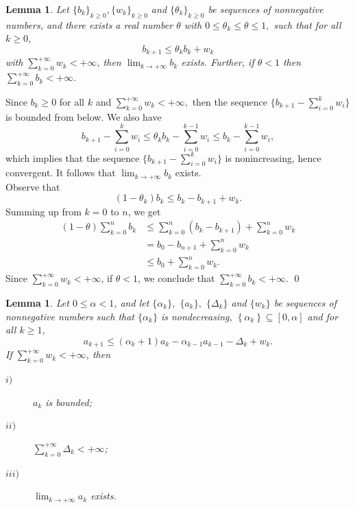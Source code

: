 \documentclass[11pt]{article}
\makeatletter
\renewenvironment{proof}[1][\proofname]{\par
	\normalfont
	\topsep0\p@\@plus3\p@ \trivlist
	\item[\hskip\labelsep\itshape
	#1\@addpunct{.}]\ignorespaces
}{%
	\qed\endtrivlist
}
\newtheorem{lemma}[theorem]{Lemma}
\theoremstyle{definition}
\theoremstyle{definition}
\theoremstyle{definition}
\makeatother
\begin{document}
\begin{lemma}\label{lem-sum}
	Let   $\{b_k\}_{k\geq0}, \{w_k\}_{k\geq0}$ and $\{\theta_k\}_{k\geq0}$   be sequences of nonnegative numbers, and there exists a real number $\theta$ with $0 \leq \theta_k \leq \theta \le 1,$   such that for all $k\geq 0$, 
	\begin{equation*}
	b_{k+1}\leq \theta_k b_k+w_k
	\end{equation*} 
	with 
	 \;$\sum_{k=0}^{+\infty} w_k< +\infty$, then $\displaystyle\lim_{k\rightarrow +\infty}b_k$ exists.  Further, if $\theta<1$ then \;$\sum_{k=0}^{+\infty} b_k< +\infty$.
\end{lemma}

\begin{proof}
	Since  $b_k\geq 0$  for all $k$ and  $\sum_{k=0}^{+\infty} w_k< +\infty,$ then the sequence $\{b_{k+1}-\sum_{i=0 }^{k} w_i\}$ is bounded  from below.
	We also have 
	$$b_{k+1}- \sum_{i=0 }^{k}  w_i\leq \theta_k b_{k}- \sum_{i=0 }^{k-1}  w_i \leq  b_{k}- \sum_{i=0 }^{k-1}  w_i,$$			
	which implies that the sequence $\{b_{k+1}- \sum_{i=0 }^{k}  w_i\}$  is nonincreasing, hence convergent. It follows that  $\displaystyle \lim_{k\rightarrow +\infty}b_k$ exists.\\
	Observe that $$(1-\theta_k)b_k\leq b_k-b_{k+1}+w_k.$$	
	Summing up from  $k=0$ to $n$, we get
	\begin{align*}
	(1-\theta)\sum_{k=0}^{n}b_k&\leq \sum_{k=0}^{n}(b_k-b_{k+1})+\sum_{k=0}^{n}w_k\\
	&=b_0-b_{n+1}+\sum_{k=0}^{n}w_k \\
	&\leq b_0+\sum_{k=0}^{n}w_k.
	\end{align*}
	Since $\sum_{k=0}^{+\infty} w_k< +\infty$, if $\theta<1$, we conclude that $\sum_{k=0}^{+\infty} b_k< +\infty$.  
\end{proof} 
\begin{lemma}\label{lem-sum1}
	Let $0\leq \alpha <1$, and let $\{\alpha_k\}, $ $\{a_k\},$ $\{\Delta_k\}$ and $\{w_k\}$ be sequences of nonnegative numbers such that $\{\alpha_k\} $ is nondecreasing, $\left\{\alpha_k\right\}\subseteq[0, \alpha]$ and  for all $k\geq 1$,  
	\begin{equation}\label{de}
	a_{k+1}\leq (\alpha_k+1)a_{k}- \alpha_{k-1} a_{k-1}-\Delta_k+w_k.
	\end{equation} 
	If \;$\sum_{k=0}^{+\infty} w_k< +\infty$, then
	\begin{description}
		\item[$i)$]	 $a_k$ is bounded;
		\item[$ii)$]  $\sum_{k=0}^{+\infty}\Delta_k< +\infty$;
		\item[$iii)$]  $\displaystyle \lim_{k\rightarrow +\infty}a_k$ exists.
	\end{description}
\end{lemma}
\end{document}
